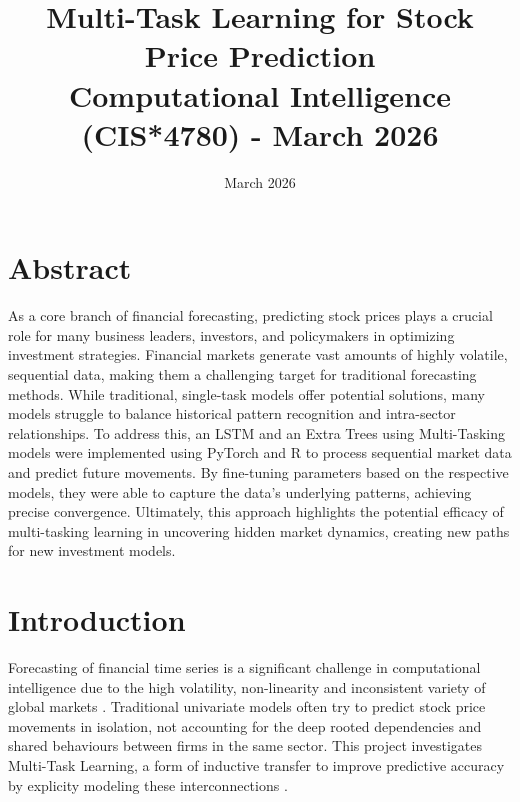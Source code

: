 \documentclass[conference]{IEEEtran}
\begin{document}
\title{Multi-Task Learning for Stock Price Prediction \\ [1ex] \large Computational Intelligence (CIS*4780) - March 2026}
\date{March 2026}

\author{
\and
{}
\and
{}}


\maketitle
\thispagestyle{plain}
\pagestyle{plain}
\section*{Abstract}
As a core branch of financial forecasting, predicting stock prices plays a crucial role for many business leaders, investors, and policymakers in optimizing investment strategies.
Financial markets generate vast amounts of highly volatile, sequential data, making them a challenging target for traditional forecasting methods. While traditional, single-task
models offer potential solutions, many models struggle to balance historical pattern recognition and intra-sector relationships. To address this, an LSTM and an Extra Trees using 
Multi-Tasking models were implemented using PyTorch and R to process sequential market data and predict future movements. By fine-tuning parameters based on the respective models,
they were able to capture the data’s underlying patterns, achieving precise convergence. Ultimately, this approach highlights the potential efficacy of multi-tasking learning in 
uncovering hidden market dynamics, creating new paths for new investment models. 

\section{Introduction}
Forecasting of financial time series is a significant challenge in computational intelligence
due to the high volatility, non-linearity and inconsistent variety of global markets \cite{fama1970efficent,abhyankar1995nonlinear}. 
Traditional univariate models often try to predict stock price movements in isolation, not accounting
for the deep rooted dependencies and shared behaviours between firms in the same sector. 
This project investigates Multi-Task Learning, a form of inductive transfer
to improve predictive accuracy by explicity modeling these interconnections \cite{caruana1997multitask}. 
\end{document}
